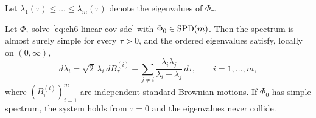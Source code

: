 Let $\lambda_1(\tau) \le \dots \le \lambda_m(\tau)$ denote the eigenvalues of $\Phi_\tau$.

\begin{theorem}
\label{thm:geom-dyson-bm}
Let $\Phi_\tau$ solve \eqref{eq:ch6-linear-cov-sde} with $\Phi_0 \in \operatorname{SPD}(m)$. Then the spectrum is almost surely simple for every $\tau > 0$, and the ordered eigenvalues satisfy, locally on $(0, \infty)$,
\begin{equation}
\label{eq:ch6-geom-dyson-sde}
d\lambda_i = \sqrt{2}\,\lambda_i\,dB_\tau^{(i)} + \sum_{j \neq i} \frac{\lambda_i \lambda_j}{\lambda_i - \lambda_j}\,d\tau, \qquad i = 1, \dots, m,
\end{equation}
where $(B_\tau^{(i)})_{i=1}^m$ are independent standard Brownian motions. If $\Phi_0$ has simple spectrum, the system holds from $\tau = 0$ and the eigenvalues never collide.
\end{theorem}

